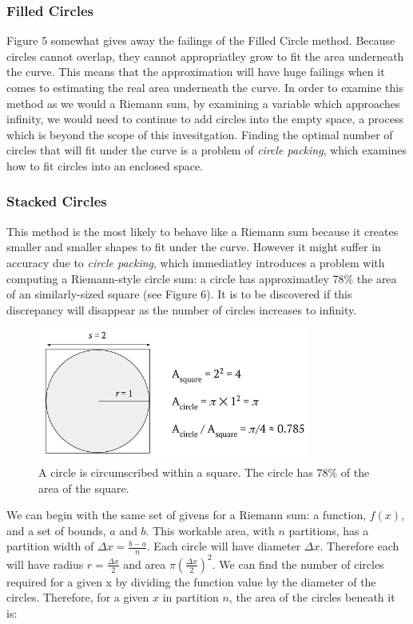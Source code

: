 \documentclass{article}
\begin{document}
      \subsubsection{Filled Circles}
        Figure 5 somewhat gives away the failings of the Filled Circle method. Because circles cannot overlap, they cannot appropriatley grow to fit the area underneath the curve. This means that the approximation will have huge failings when it comes to estimating the real area underneath the curve. In order to examine this method as we would a Riemann sum, by examining a variable which approaches infinity, we would need to continue to add circles into the empty space, a process which is beyond the scope of this invesitgation. Finding the optimal number of circles that will fit under the curve is a problem of \emph{circle packing}, which examines how to fit circles into an enclosed space.

      \subsubsection{Stacked Circles}
        This method is the most likely to behave like a Riemann sum because it creates smaller and smaller shapes to fit under the curve. However it might suffer in accuracy due to \emph{circle packing}, which immediatley introduces a problem with computing a Riemann-style circle sum: a circle has approximatley 78\% the area of an similarly-sized square (see Figure 6). It is to be discovered if this discrepancy will disappear as the number of circles increases to infinity.

        \begin{figure}[h]
          \centering
          \includegraphics[width=0.8\textwidth]{circle_packing}
          \caption{A circle is circumscribed within a square. The circle has 78\% of the area of the square.}
        \end{figure}

        We can begin with the same set of givens for a Riemann sum: a function, \( f(x) \), and a set of bounds, \( a \) and \( b \). This workable area, with \( n \) partitions, has a partition width of \( \Delta x = \frac{b-a}{n} \). Each circle will have diameter \( \Delta x \). Therefore each will have radius \( r = \frac{\Delta x}{2} \) and area \( \pi \left(\frac{\Delta x}{2}\right)^2 \). We can find the number of circles required for a given x by dividing the function value by the diameter of the circles. Therefore, for a given \( x \) in partition \( n \), the area of the circles beneath it is:
\end{document}
